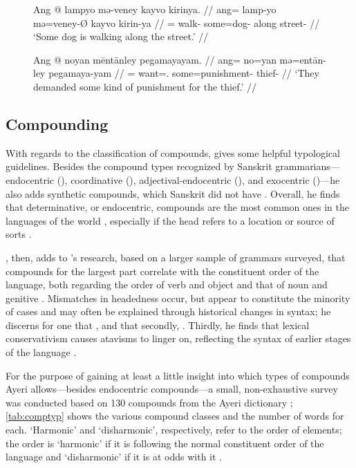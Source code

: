 \begin{figure}[h]
\pex\label{ex:menoun}
\a\begingl
	\gla Ang @ lampyo mə-veney kayvo kirinya. //
	\glb ang= lamp-yo mə=veney-Ø kayvo kirin-ya //
	\glc \AgtT{}= walk-\TsgN{} some=dog-\Top{} along street-\Loc{} //
	\glft `Some dog is walking along the street.' //
\endgl

\a\begingl
	\gla Ang @ noyan mēntānley pegamayayam. //
	\glb ang= no=yan mə=entān-ley pegamaya-yam //
	\glc \AgtT{}= want=\TsgM{}.\Top{} some=punishment-\PargI{} 
		thief-\Dat{} //
	\glft `They demanded some kind of punishment for the thief.' //
\endgl
\xe
\end{figure}


\subsection{Compounding}
\label{subsec:compounds}

With regards to the classification of compounds, \citet{bauer2001} gives some 
helpful typological guidelines. Besides the compound types recognized by 
Sanskrit grammarians---endocentric (), coordinative 
(), adjectival-endo\-cent\-ric (), and 
exocentric ()---he also adds synthetic compounds, which Sanskrit 
did not have \citep[697]{bauer2001}. Overall, he finds that determinative, or 
endocentric, compounds are the most common ones in the languages of the world 
\citep[697]{bauer2001}, especially if the head refers to a location or source 
of sorts \citep[702]{bauer2001}.

\citet{gaeta2008}, then, adds to \citet{bauer2001}'s research, based on a
larger sample of grammars surveyed, that compounds for the largest part
correlate with the constituent order of the language, both regarding the order
of verb and object and that of noun and genitive \citep[129--133]{gaeta2008}.
Mismatches in headedness occur, but appear to constitute the minority of cases
and may often be explained through historical changes in syntax; he discerns
for one that , and that secondly, . Thirdly, he
finds that lexical conservativism causes atavisms to linger on, reflecting the
syntax of earlier stages of the language \citep[138--139]{gaeta2008}.

For the purpose of gaining at least a little insight into which
types of compounds Ayeri allows---besides endocentric
compounds---a small, non-exhaustive survey was conducted based on 130 compounds
from the Ayeri dictionary \citep[Dictionary]{benung}; \autoref{tab:comptyp}
shows the various compound classes and the number of words for each. `Harmonic'
and `disharmonic', respectively, refer to the order of elements; the order is
`harmonic' if it is following the normal constituent order of the language and
`disharmonic' if it is at odds with it \citep{gaeta2008}.

